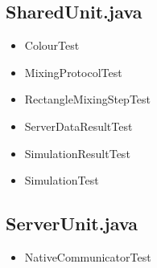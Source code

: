 \subsection{SharedUnit.java}
\begin{itemize}
\item 	ColourTest
\item	MixingProtocolTest
\item	RectangleMixingStepTest
\item 	ServerDataResultTest
\item	SimulationResultTest
\item	SimulationTest
\end{itemize}

\subsection{ServerUnit.java}
\begin{itemize}
\item NativeCommunicatorTest
\end{itemize}
